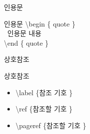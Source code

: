 \documentclass[10pt,xcolor=pdftex,dvipsnames,table,handout]{beamer}
\begin{document}

		\begin{frame}[t]{인용문}

			\begin{block} {인용문}
			\textbackslash begin \{ quote \}\\
			~인용문 내용 \\
			\textbackslash end \{ quote \}
			\end{block}

		\end{frame}





		\begin{frame}[t]{상호참조}

			\begin{block} {상호참조}
				\begin{itemize}
				\item \textbackslash label \{참조 기호 \}
				\item \textbackslash ref \{참조할 기호 \}
				\item \textbackslash pageref \{참조할 기호 \}
				\end{itemize}
			\end{block}

		\end{frame}
\end{document}
